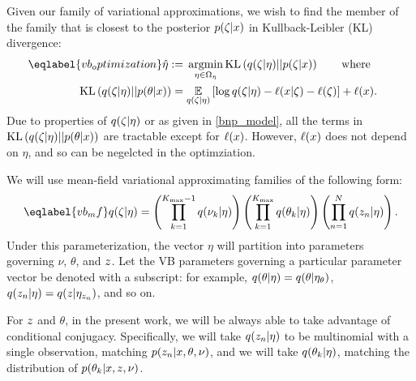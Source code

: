 Given our family of variational approximations, we wish to find the member of
the family that is closest to the posterior $p(\zeta \vert x)$ in
Kullback-Leibler (KL) divergence:
%
\begin{align}\eqlabel{vb_optimization}
%
\etaopt :={}&
    \argmin_{\eta \in \etadom}
        \KL{\q(\zeta \vert \eta) || p(\zeta \vert \x)} \mathwhere \\
\KL{\q(\zeta \vert \eta) || p(\theta \vert \x)}
={}&    \expect{\q(\zeta \vert \eta)}{
        \log \q(\zeta \vert \eta) - \logp(\x \vert \zeta) -
        \logp(\zeta)} + \logp(\x). \nonumber
%
\end{align}
%
Due to properties of $q(\zeta \vert \eta)$ or as given in \eqref{bnp_model},
all the terms in $\mathrm{KL}\left(q(\zeta \vert \eta) || p(\theta \vert x)\right)$ are tractable
except for $\ell(x)$.  However, $\ell(x)$ does not depend on $\eta$, and
so can be negelcted in the optimziation.

We will use mean-field variational approximating families of the following form:
%
\begin{align}\eqlabel{vb_mf}
%
\q(\zeta \vert \eta) =
    \left( \prod_{\k=1}^{\kmax - 1} \q(\nuk \vert \eta) \right)
    \left( \prod_{\k=1}^{\kmax} \q(\theta_\k \vert \eta) \right)
    \left( \prod_{\n=1}^{\N} \q(\z_{\n} \vert \eta) \right).
%
\end{align}
%
Under this parameterization, the vector $\eta$ will partition into parameters
governing $\nu$, $\theta$, and $z$.  Let the VB parameters governing a
particular parameter vector be denoted with a subscript: for example, $q(\theta
\vert \eta) = q(\theta \vert \eta_{\theta})$, $q(z_n \vert \eta) = q(z \vert
\eta_{z_{n}})$, and so on.

For $z$ and $\theta$, in the present work, we will be always able to take
advantage of conditional conjugacy.  Specifically, we will take $q(z_{n}
\vert \eta)$ to be multinomial with a single observation, matching $p(z_{n}
\vert x, \theta, \nu)$, and we will take $q(\theta_k \vert \eta)$, matching
the distribution of $p(\theta_{k} \vert x, z, \nu)$.


